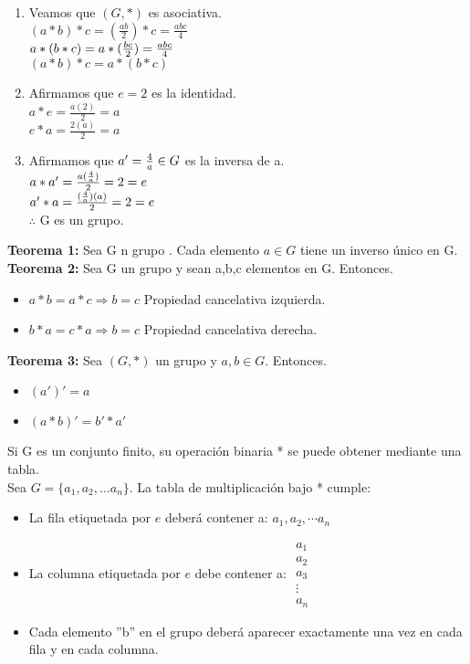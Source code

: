 \begin{enumerate}
\item Veamos que $(G,*)$ es asociativa.\\
$(a*b)*c=(\frac{ab}{2})*c=\frac{abc}{4}$\\
$a*(b*c)=a*({bc\over2})={abc\over4}$\\
$(a*b)*c=a*(b*c)$

\item Afirmamos que $e=2$ es la identidad.\\
$a*e= \frac{a(2)}{2} = a$\\
$e*a=\frac{2(a)}{2}=a$

\item Afirmamos que $a'={4\over a} \in G$ es la inversa de a.\\
$a*a'=\frac{a({4\over a})}{2} = 2 = e$\\
$a'*a=\frac{({4\over a})(a)}{2}=2=e$\\
$\therefore$ G es un grupo.
\end{enumerate}

\textbf{Teorema 1: }Sea G n grupo . Cada elemento $a\in G$ tiene un inverso único en G.\\

\textbf{Teorema 2: }Sea G un grupo y sean a,b,c elementos en G. Entonces.
\begin{itemize}
\item $a*b=a*c \Rightarrow b=c$ Propiedad cancelativa izquierda.
\item $b*a=c*a \Rightarrow b=c$ Propiedad cancelativa derecha.
\end{itemize}

\textbf{Teorema 3: }Sea $(G,*)$ un grupo y $a,b\in G$. Entonces.
\begin{itemize}
\item $(a')'=a$
\item $(a*b)'=b'*a'$
\end{itemize}

Si G es un conjunto finito, su operación binaria * se puede obtener mediante una tabla.\\
Sea $G=\lbrace a_1,a_2,...a_n\rbrace$. La tabla de multiplicación bajo * cumple:
\begin{itemize}
\item La fila etiquetada por $e$ deberá contener a:  $a_1, a_2, \cdots a_n$
\item La columna etiquetada por $e$ debe contener a:  $\begin{matrix}a_1\\a_2\\a_3\\ \vdots \\ a_n\end{matrix}$

\item Cada elemento ''b'' en el grupo deberá aparecer exactamente una vez en cada fila y en cada columna.
\end{itemize}

